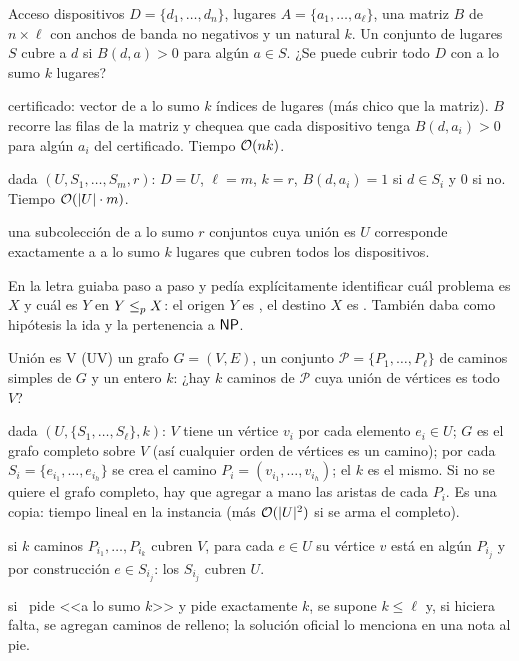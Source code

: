 \begin{problema}{Acceso}
 dispositivos $D=\{d_1,\dots,d_n\}$, lugares $A=\{a_1,\dots,a_\ell\}$, una matriz $B$ de $n\times\ell$ con anchos de banda no negativos y un natural $k$. Un conjunto de lugares $S$ cubre a $d$ si $B(d,a)>0$ para algún $a\in S$. ¿Se puede cubrir todo $D$ con a lo sumo $k$ lugares?

 certificado: vector de a lo sumo $k$ índices de lugares (más chico que la matriz). $B$ recorre las filas de la matriz y chequea que cada dispositivo tenga $B(d,a_i)>0$ para algún $a_i$ del certificado. Tiempo $\mathcal{O}(nk)$.

 dada $(U,S_1,\dots,S_m,r)$: $D=U$, $\ell=m$, $k=r$, $B(d,a_i)=1$ si $d\in S_i$ y $0$ si no. Tiempo $\mathcal{O}(|U|\cdot m)$.

 una subcolección de a lo sumo $r$ conjuntos cuya unión es $U$ corresponde exactamente a a lo sumo $k$ lugares que cubren todos los dispositivos.
\end{problema}

En  la letra guiaba paso a paso y pedía explícitamente identificar cuál problema es $X$ y cuál es $Y$ en $Y\le_{p} X$: el origen $Y$ es \npSC, el destino $X$ es . También daba como hipótesis la ida y la pertenencia a $\mathsf{NP}$.

\begin{problema}{Unión es V (UV)}
 un grafo $G=(V,E)$, un conjunto $\mathcal P=\{P_1,\dots,P_\ell\}$ de caminos simples de $G$ y un entero $k$: ¿hay $k$ caminos de $\mathcal P$ cuya unión de vértices es todo $V$?

 dada $(U,\{S_1,\dots,S_\ell\},k)$: $V$ tiene un vértice $v_i$ por cada elemento $e_i\in U$; $G$ es el grafo completo sobre $V$ (así cualquier orden de vértices es un camino); por cada $S_i=\{e_{i_1},\dots,e_{i_h}\}$ se crea el camino $P_i=(v_{i_1},\dots,v_{i_h})$; el $k$ es el mismo. Si no se quiere el grafo completo, hay que agregar a mano las aristas de cada $P_i$. Es una copia: tiempo lineal en la instancia (más $\mathcal{O}(|U|^2)$ si se arma el completo).

 si $k$ caminos $P_{i_1},\dots,P_{i_k}$ cubren $V$, para cada $e\in U$ su vértice $v$ está en algún $P_{i_j}$ y por construcción $e\in S_{i_j}$: los $S_{i_j}$ cubren $U$.

 si \npSC\ pide <<a lo sumo $k$>> y  pide exactamente $k$, se supone $k\le\ell$ y, si hiciera falta, se agregan caminos de relleno; la solución oficial lo menciona en una nota al pie.
\end{problema}

